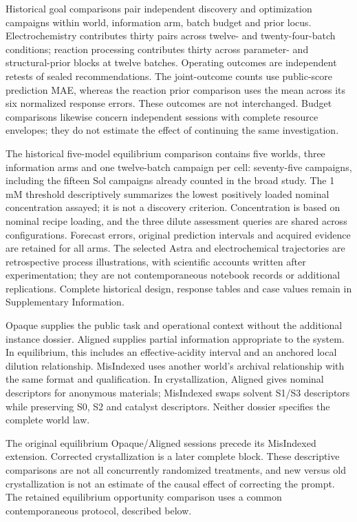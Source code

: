 \documentclass[12pt,a4paper]{article}
\begin{document}
Historical goal comparisons pair independent discovery and optimization campaigns within world, information arm, batch budget and prior locus. Electrochemistry contributes thirty pairs across twelve- and twenty-four-batch conditions; reaction processing contributes thirty across parameter- and structural-prior blocks at twelve batches. Operating outcomes are independent retests of sealed recommendations. The joint-outcome counts use public-score prediction MAE, whereas the reaction prior comparison uses the mean across its six normalized response errors. These outcomes are not interchanged. Budget comparisons likewise concern independent sessions with complete resource envelopes; they do not estimate the effect of continuing the same investigation.

The historical five-model equilibrium comparison contains five worlds, three information arms and one twelve-batch campaign per cell: seventy-five campaigns, including the fifteen Sol campaigns already counted in the broad study. The 1 mM threshold descriptively summarizes the lowest positively loaded nominal concentration assayed; it is not a discovery criterion. Concentration is based on nominal recipe loading, and the three dilute assessment queries are shared across configurations. Forecast errors, original prediction intervals and acquired evidence are retained for all arms. The selected Astra and electrochemical trajectories are retrospective process illustrations, with scientific accounts written after experimentation; they are not contemporaneous notebook records or additional replications. Complete historical design, response tables and case values remain in Supplementary Information.

Opaque supplies the public task and operational context without the additional instance dossier. Aligned supplies partial information appropriate to the system. In equilibrium, this includes an effective-acidity interval and an anchored local dilution relationship. MisIndexed uses another world's archival relationship with the same format and qualification. In crystallization, Aligned gives nominal descriptors for anonymous materials; MisIndexed swaps solvent S1/S3 descriptors while preserving S0, S2 and catalyst descriptors. Neither dossier specifies the complete world law.

The original equilibrium Opaque/Aligned sessions precede its MisIndexed extension. Corrected crystallization is a later complete block. These descriptive comparisons are not all concurrently randomized treatments, and new versus old crystallization is not an estimate of the causal effect of correcting the prompt. The retained equilibrium opportunity comparison uses a common contemporaneous protocol, described below.
\end{document}
